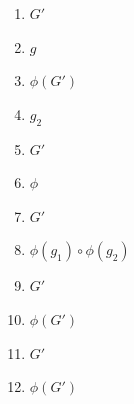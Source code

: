 \begin{multicols}{3}
\begin{enumerate}
\item
$G'$

\item
$g$

\item
$\phi(G')$

\item
$g_2$

\item
$G'$

\item
$\phi$

\item
$G'$

\item
$\phi(g_1) \circ \phi(g_2)$

\item
$G'$

\item
$\phi(G')$

\item
$G'$

\item
$\phi(G')$
\end{enumerate}
\end{multicols}




